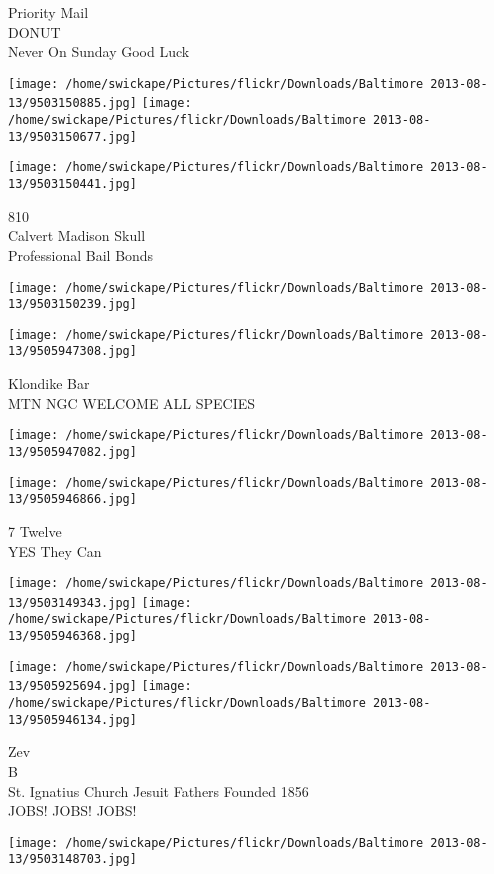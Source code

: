 \documentclass[10pt,letterpaper]{article}
\begin{document}
Priority Mail\\
DONUT\\
Never On Sunday Good Luck
\pagebreak

\texttt{[image: /home/swickape/Pictures/flickr/Downloads/Baltimore 2013-08-13/9503150885.jpg]}
\texttt{[image: /home/swickape/Pictures/flickr/Downloads/Baltimore 2013-08-13/9503150677.jpg]}

\texttt{[image: /home/swickape/Pictures/flickr/Downloads/Baltimore 2013-08-13/9503150441.jpg]}

810\\
Calvert Madison Skull\\
Professional Bail Bonds
\pagebreak

\texttt{[image: /home/swickape/Pictures/flickr/Downloads/Baltimore 2013-08-13/9503150239.jpg]}

\vspace{0.25in}
\texttt{[image: /home/swickape/Pictures/flickr/Downloads/Baltimore 2013-08-13/9505947308.jpg]}

Klondike Bar\\
MTN NGC WELCOME ALL SPECIES
\pagebreak

\texttt{[image: /home/swickape/Pictures/flickr/Downloads/Baltimore 2013-08-13/9505947082.jpg]}

\vspace{0.25in}
\texttt{[image: /home/swickape/Pictures/flickr/Downloads/Baltimore 2013-08-13/9505946866.jpg]}

7 Twelve\\
YES They Can
\pagebreak

\texttt{[image: /home/swickape/Pictures/flickr/Downloads/Baltimore 2013-08-13/9503149343.jpg]}
\texttt{[image: /home/swickape/Pictures/flickr/Downloads/Baltimore 2013-08-13/9505946368.jpg]}

\texttt{[image: /home/swickape/Pictures/flickr/Downloads/Baltimore 2013-08-13/9505925694.jpg]}
\texttt{[image: /home/swickape/Pictures/flickr/Downloads/Baltimore 2013-08-13/9505946134.jpg]}

Zev\\
B\\
St. Ignatius Church Jesuit Fathers Founded 1856\\
JOBS! JOBS! JOBS!
\pagebreak

\texttt{[image: /home/swickape/Pictures/flickr/Downloads/Baltimore 2013-08-13/9503148703.jpg]}
\end{document}

